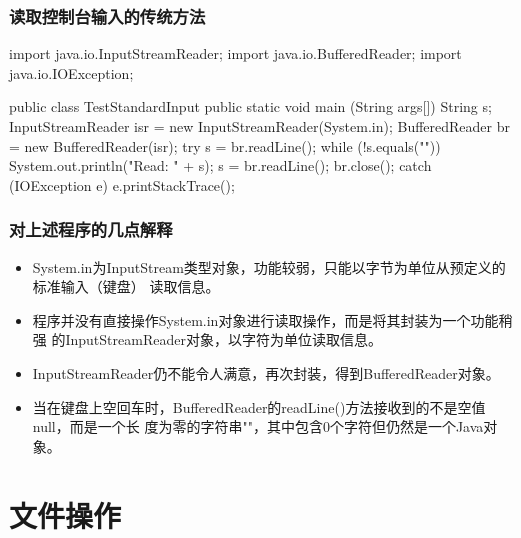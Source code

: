 \begin{frame}[fragile] %
  \frametitle{读取控制台输入的传统方法}

  \begin{javaCode}
    import java.io.InputStreamReader; 
    import java.io.BufferedReader; 
    import java.io.IOException;

    public class TestStandardInput {
      public static void main (String args[]) {
        String s;
        InputStreamReader isr = new InputStreamReader(System.in); 
        BufferedReader br = new BufferedReader(isr);
        try {
          s = br.readLine(); 
          while (!s.equals("")) {
            System.out.println("Read: " + s);
            s = br.readLine(); 
          }
          br.close();
        } catch (IOException e) {
          e.printStackTrace(); 
        }
      } 
    }  
  \end{javaCode}
\end{frame}

\begin{frame}[fragile] %
  \frametitle{对上述程序的几点解释}

  \begin{itemize}[<+-| structure@+>]
  \item System.in为InputStream类型对象，功能较弱，只能以字节为单位从预定义的标准输入（键盘）
    读取信息。
  \item 程序并没有直接操作System.in对象进行读取操作，而是将其封装为一个功能稍强
    的InputStreamReader对象，以字符为单位读取信息。
  \item InputStreamReader仍不能令人满意，再次封装，得到BufferedReader对象。
  \item 当在键盘上空回车时，BufferedReader的readLine()方法接收到的不是空值null，而是一个长
    度为零的字符串""，其中包含0个字符但仍然是一个Java对象。
  \end{itemize}
\end{frame}

\section{文件操作}

